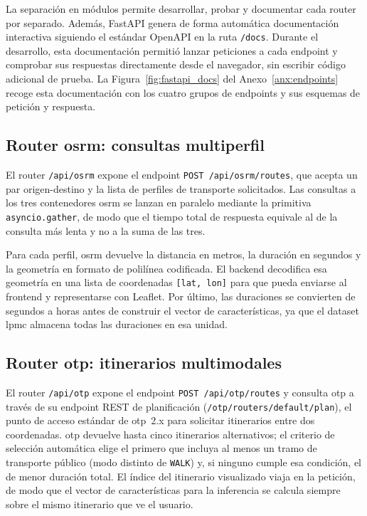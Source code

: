La separación en módulos permite desarrollar, probar y documentar cada router por separado. Además, FastAPI genera de forma automática documentación interactiva siguiendo el estándar OpenAPI en la ruta \texttt{/docs}. Durante el desarrollo, esta documentación permitió lanzar peticiones a cada endpoint y comprobar sus respuestas directamente desde el navegador, sin escribir código adicional de prueba. La Figura~\ref{fig:fastapi_docs} del Anexo~\ref{anx:endpoints} recoge esta documentación con los cuatro grupos de endpoints y sus esquemas de petición y respuesta.

\subsection[Router OSRM: consultas multiperfil]{Router \gls{osrm}: consultas multiperfil}
\label{subsec:impl_backend_osrm}

El router \texttt{/api/osrm} expone el endpoint \texttt{POST /api/osrm/routes}, que acepta un par origen-destino y la lista de perfiles de transporte solicitados. Las consultas a los tres contenedores \gls{osrm} se lanzan en paralelo mediante la primitiva \texttt{asyncio.gather}, de modo que el tiempo total de respuesta equivale al de la consulta más lenta y no a la suma de las tres.\newline

Para cada perfil, \gls{osrm} devuelve la distancia en metros, la duración en segundos y la geometría en formato de polilínea codificada. El backend decodifica esa geometría en una lista de coordenadas \texttt{[lat, lon]} para que pueda enviarse al frontend y representarse con Leaflet. Por último, las duraciones se convierten de segundos a horas antes de construir el vector de características, ya que el dataset \gls{lpmc} almacena todas las duraciones en esa unidad.

\subsection[Router OTP: itinerarios multimodales]{Router \gls{otp}: itinerarios multimodales}
\label{subsec:impl_backend_otp}

El router \texttt{/api/otp} expone el endpoint \texttt{POST /api/otp/routes} y consulta \gls{otp} a través de su endpoint REST de planificación (\texttt{/otp/routers/default/plan}), el punto de acceso estándar de \gls{otp}~2.x para solicitar itinerarios entre dos coordenadas. \gls{otp} devuelve hasta cinco itinerarios alternativos; el criterio de selección automática elige el primero que incluya al menos un tramo de transporte público (modo distinto de \texttt{WALK}) y, si ninguno cumple esa condición, el de menor duración total. El índice del itinerario visualizado viaja en la petición, de modo que el vector de características para la inferencia se calcula siempre sobre el mismo itinerario que ve el usuario.\newline

